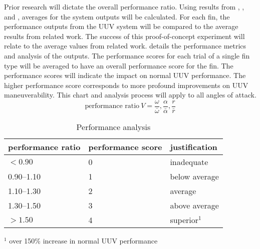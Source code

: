\documentclass{IEEEtran}
\begin{document}
Prior research will dictate the overall performance ratio.  Using results from \cite{hiller2012expanding}, \cite{berenice2018splash}, and \cite{orourke2020navy}, averages for the system outputs will be calculated.  For each fin, the performance outputs from the UUV system will be compared to the average results from related work.  The success of this proof-of-concept experiment will relate to the average values from related work.   details the performance metrics and analysis of the outputs.  The performance scores for each trial of a single fin type will be averaged to have an overall performance score for the fin.  The performance scores will indicate the impact on normal UUV performance.  The higher performance score corresponds to more profound improvements on UUV maneuverability.  This chart and analysis process will apply to all angles of attack.    
\begin{equation}
\mbox{performance ratio}\ V = \frac{\omega}{\bar{\omega}}, \frac{\alpha}{\bar{\alpha}}, \frac{r}{\bar{r}} 
\label{eq:performanceratio}
\end{equation}

\begin{table}
\caption{Performance analysis}
\label{tab:1}
\begin{center}
\begin{tabular}{lll}
\toprule
performance ratio & performance score & justification \\
\midrule 
$< \num{0.90}$ & 0 & inadequate \\
\numrange{0.90}{1.10} & 1 & below average \\
\numrange{1.10}{1.30} & 2 & average \\
\numrange{1.30}{1.50} & 3 & above average \\
$> \num{1.50}$ & 4 & superior$^1$\\
\bottomrule
\end{tabular}

\vspace{1em}
$^1$ over 150\% increase in normal UUV performance
\end{center}
\end{table}
\end{document}
